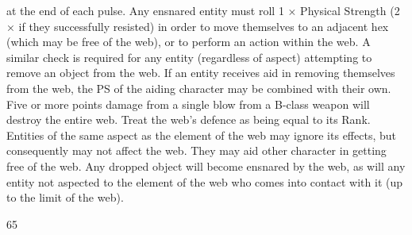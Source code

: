 \documentclass[a4paper]{article}
\begin{document}
\begin{multicols}{3}
at the end of each pulse. Any ensnared entity must
roll 1 × Physical Strength (2 × if they successfully
resisted) in order to move themselves to an adjacent hex (which may be free of the web), or to
perform an action within the web. A similar check
is required for any entity (regardless of aspect)
attempting to remove an object from the web. If an
entity receives aid in removing themselves from
the web, the PS of the aiding character may be
combined with their own. Five or more points
damage from a single blow from a B-class weapon
will destroy the entire web. Treat the web’s defence as being equal to its Rank. Entities of the
same aspect as the element of the web may ignore
its effects, but consequently may not affect the
web. They may aid other character in getting free
of the web. Any dropped object will become ensnared by the web, as will any entity not aspected
to the element of the web who comes into contact
with it (up to the limit of the web).

65


\end{multicols}
\end{document}
